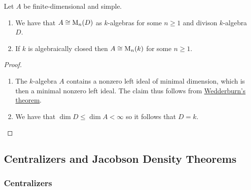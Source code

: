 

\begin{corollary}[Wedderburn]
  \label{corollary: wedderburn for algebras}
  Let $A$ be finite-dimensional and simple.
  \begin{enumerate}
    \item
      We have that $A \cong \operatorname{M}_n(D)$ as $k$-algebras for some $n \geq 1$ and divison $k$-algebra $D$.
    \item
      If $k$ is algebraically closed then $A \cong \operatorname{M}_n(k)$ for some $n \geq 1$.
  \end{enumerate}
\end{corollary}


\begin{proof}
  \leavevmode
  \begin{enumerate}
    \item
      The $k$-algebra $A$ contains a nonzero left ideal of minimal dimension, which is then a minimal nonzero left ideal.
      The claim thus follows from \hyperref[theorem: wedderburns theorem]{Wedderburn’s theorem}.
    \item
      We have that $\dim D \leq \dim A < \infty$ so it follows that $D = k$.
    \qedhere
  \end{enumerate}
\end{proof}





\subsection*{Centralizers and Jacobson Density Theorems}



\subsubsection{Centralizers}

